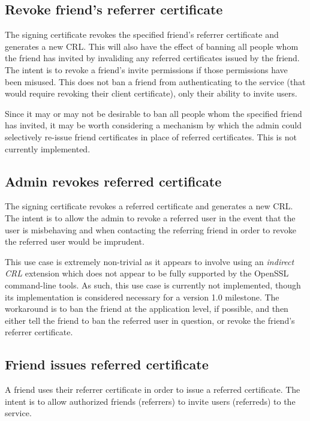 \documentclass{article}
\begin{document}
\subsection{Revoke friend's referrer certificate}
\label{revoke-referrer}
The signing certificate revokes the specified friend's referrer certificate and generates a new CRL.  This will also have the effect of banning all people whom the friend has invited by invaliding any referred certificates issued by the friend.  The intent is to revoke a friend's invite permissions if those permissions have been misused.  This does not ban a friend from authenticating to the service (that would require revoking their client certificate), only their ability to invite users.

Since it may or may not be desirable to ban all people whom the specified friend has invited, it may be worth considering a mechanism by which the admin could selectively re-issue friend certificates in place of referred certificates.  This is not currently implemented.

\subsection{Admin revokes referred certificate}
\label{admin-revoke-referred}
The signing certificate revokes a referred certificate and generates a new CRL.  The intent is to allow the admin to revoke a referred user in the event that the user is misbehaving and when contacting the referring friend in order to revoke the referred user would be imprudent.

This use case is extremely non-trivial as it appears to involve using an \emph{indirect CRL} extension which does not appear to be fully supported by the OpenSSL command-line tools.  As such, this use case is currently not implemented, though its implementation is considered necessary for a version 1.0 milestone.  The workaround is to ban the friend at the application level, if possible, and then either tell the friend to ban the referred user in question, or revoke the friend's referrer certificate.

\subsection{Friend issues referred certificate}
\label{sign-referred}
A friend uses their referrer certificate in order to issue a referred certificate.  The intent is to allow authorized friends (referrers) to invite users (referreds) to the service.
\end{document}
